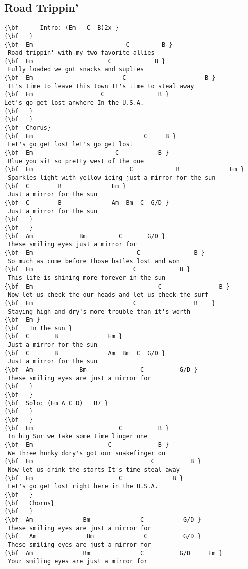 \documentclass[a4paper]{article}
\begin{document}
\subsection{Road Trippin'}
\begin{Verbatim}[commandchars=\\\{\}]
{\bf  	  Intro: (Em   C  B)2x }
{\bf   }
{\bf  Em                          C         B }
 Road trippin' with my two favorite allies 
{\bf  Em                     C            B }
 Fully loaded we got snacks and suplies 
{\bf  Em                         C                      B }
 It's time to leave this town It's time to steal away 
{\bf  Em                   C               B }
Let's go get lost anwhere In the U.S.A. 
{\bf   }
{\bf   }
{\bf  Chorus}
{\bf  Em                               C     B }
 Let's go get lost let's go get lost 
{\bf  Em                       C           B }
 Blue you sit so pretty west of the one 
{\bf  Em                           C            B              Em }
 Sparkles light with yellow icing just a mirror for the sun  
{\bf  C        B              Em }
 Just a mirror for the sun 
{\bf  C        B              Am  Bm  C  G/D }
 Just a mirror for the sun 
{\bf   }
{\bf   }
{\bf  Am             Bm         C       G/D }
 These smiling eyes just a mirror for 
{\bf  Em                             C               B }
 So much as come before those batles lost and won 
{\bf  Em                            C            B }
 This life is shining more forever in the sun 
{\bf  Em                                   C                B }
 Now let us check the our heads and let us check the surf 
{\bf  Em                            C                B    }
 Staying high and dry's more trouble than it's worth 
{\bf  Em }
{\bf   In the sun }
{\bf  C       B              Em }
 Just a mirror for the sun 
{\bf  C       B              Am  Bm  C  G/D }
 Just a mirror for the sun 
{\bf  Am             Bm               C          G/D }
 These smiling eyes are just a mirror for 
{\bf   }
{\bf   }
{\bf  Solo: (Em A C D)   B7 }
{\bf   }
{\bf   }
{\bf  Em                        C          B }
 In big Sur we take some time linger one 
{\bf  Em                     C             B }
 We three hunky dory's got our snakefinger on 
{\bf  Em                                 C          B }
 Now let us drink the starts It's time steal away 
{\bf  Em                        C              B }
 Let's go get lost right here in the U.S.A. 
{\bf   }
{\bf   Chorus}
{\bf   }
{\bf  Am              Bm              C           G/D }
 These smiling eyes are just a mirror for 
{\bf   Am              Bm              C          G/D }
 These smiling eyes are just a mirror for 
{\bf  Am              Bm              C          G/D     Em }
 Your smiling eyes are just a mirror for 

\end{Verbatim}
\newpage
\end{document}
